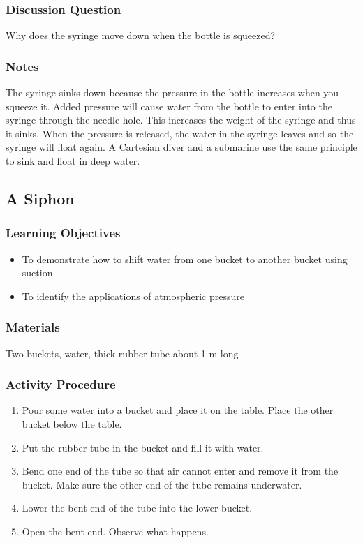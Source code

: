 \subsubsection*{Discussion Question}
Why does the syringe move down when the bottle is squeezed?

\subsubsection*{Notes}
The syringe sinks down because the pressure in the bottle increases when you squeeze it. Added pressure will cause water from the bottle to enter into the syringe through the needle hole. This increases the weight of the syringe and thus it sinks. When the pressure is released, the water in the syringe leaves and so the syringe will float again. A Cartesian diver and a submarine use the same principle to sink and float in deep water.


\subsection{A Siphon}

\subsubsection*{Learning Objectives}
\begin{itemize}
\item{To demonstrate how to shift water from one bucket to another bucket using suction} 
\item{To identify the applications of atmospheric pressure} 
\end{itemize}

\subsubsection*{Materials}
Two buckets, water, thick rubber tube about 1 m long

\subsubsection*{Activity Procedure}
\begin{enumerate}
\item{Pour some water into a bucket and place it on the table. Place the other bucket below the table.} 
\item{Put the rubber tube in the bucket and fill it with water.} 
\item{Bend one end of the tube so that air cannot enter and remove it from the bucket. Make sure the other end of the tube remains underwater.}
\item{Lower the bent end of the tube into the lower bucket.}
\item{Open the bent end. Observe what happens.} 
\end{enumerate}

